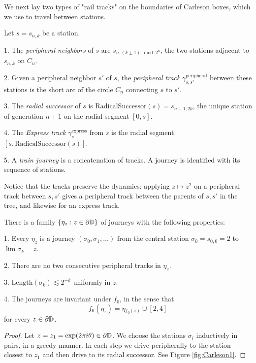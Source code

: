 We next lay two types of "rail tracks" on the boundaries of Carleson boxes, which we use to travel between stations.

\begin{definition}
Let $s=s_{n,k}$ be a station.

1. The \emph{peripheral neighbors} of $s$ are $s_{n,\left(k\pm1\right)\mod2^{n}}$,
the two stations adjacent to $s_{n,k}$ on $C_{n}$.

2. Given a peripheral neighbor $s'$ of $s$, the \emph{peripheral
	track }$\gamma_{s,s'}^{\text{peripheral}}$ between these stations
is the short arc of the circle $C_{n}$ connecting $s$ to $s'$.

3. The \emph{radial successor} of $s$ is $\mathrm{RadicalSuccessor}(s)=s_{n+1,2k}$, the unique station of generation $n+1$ on the radial segment $[0,s]$.

4. The \emph{Express track} $\gamma_{s}^{\text{express}}$ from $s$ is the radial segment $[s,\mathrm{RadicalSuccessor}(s)]$.

5. A \emph{train journey} is a concatenation of tracks. A journey is identified with its sequence of stations. %
\end{definition}

Notice that the tracks preserve the dynamics: applying $z\mapsto z^{2}$
on a peripheral track between $s,s'$ gives a peripheral track between the
parents of $s,s'$ in the tree, and likewise for an express track.
 
\begin{lemma}
There is a family $\{\eta_{z}:z\in\partial\mathbb{D}\}$ of journeys with
the following properties:

1. Every $\eta_{z}$ is a journey $\left(\sigma_{0},\sigma_{1},\ldots\right)$
from the central station $\sigma_{0}=s_{0,0}=2$ to $\lim\sigma_{k}=z$.

2. There are no two consecutive peripheral tracks in $\eta_{z}$.

3. $\mathrm{Length}(\sigma_{k})\lesssim2^{-k}$ uniformly in $z$. 

4. The journeys are invariant under $f_{0}$, in the sense that $$f_{0}(\eta_{z})=\eta{}_{f_{0}(z)}\cup[2,4]$$
for every $z\in\partial\mathbb{D}$.
\end{lemma}

\begin{proof}
Let $z=z_{1}=\exp(2\pi i\theta)\in\partial\mathbb{D}$. We choose the stations
$\sigma_{i}$ inductively in pairs, in a greedy manner. In each step
we drive peripherally to the station closest to $z_{1}$ and then
drive to its radial successor. See Figure \ref{fig:Carleson1}. 
\end{proof}


